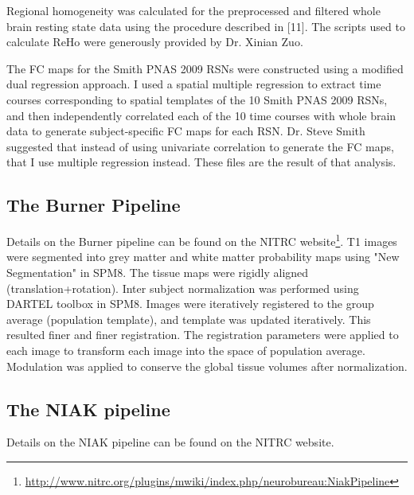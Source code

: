 \documentclass[preprint,12pt,1p]{elsarticle}
\begin{document}
\par 
Regional homogeneity was calculated for the preprocessed and filtered whole brain resting state data using the procedure described in [11]. The scripts used to calculate ReHo were generously provided by Dr. Xinian Zuo. 
\par 
The FC maps for the Smith PNAS 2009 RSNs were constructed using a modified dual regression approach. I used a spatial multiple regression to extract time courses corresponding to spatial templates of the 10 Smith PNAS 2009 RSNs, and then independently correlated each of the 10 time courses with whole brain data to generate subject-specific FC maps for each RSN. Dr. Steve Smith suggested that instead of using univariate correlation to generate the FC maps, that I use multiple regression instead. These files are the result of that analysis.

\subsection{The Burner Pipeline}
Details on the Burner pipeline can be found on the NITRC website\footnote{\url{http://www.nitrc.org/plugins/mwiki/index.php/neurobureau:NiakPipeline}}.
T1 images were segmented into grey matter and white matter probability maps using "New Segmentation" in SPM8. The tissue maps were rigidly aligned (translation+rotation). Inter subject normalization was performed using DARTEL toolbox in SPM8. Images were iteratively registered to the group average (population template), and template was updated iteratively. This resulted finer and finer registration. The registration parameters were applied to each image to transform each image into the space of population average. Modulation was applied to conserve the global tissue volumes after normalization.

\subsection{The NIAK pipeline}
Details on the NIAK pipeline can be found on the NITRC website.

\end{document}
